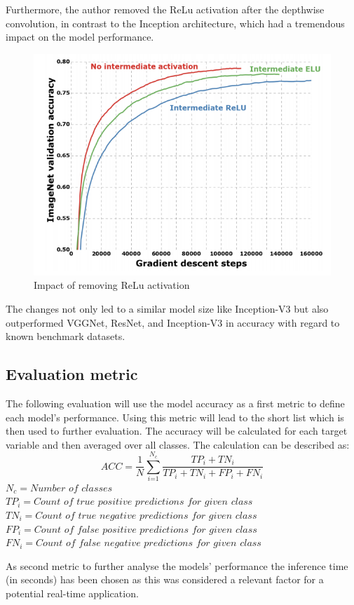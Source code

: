 Furthermore, the author removed the ReLu activation after the depthwise convolution, in contrast to the Inception architecture, which had a tremendous impact on the model performance.
\begin{figure}
  \centering
  \includegraphics[width=\linewidth]{figures/xception_activation.png}
  \caption{Impact of removing ReLu activation\cite{chollet2017xception}}
  \label{xception_activation}
\end{figure}

The changes not only led to a similar model size like Inception-V3 but also outperformed  VGGNet, ResNet, and Inception-V3 in accuracy with regard to known benchmark datasets\cite{chollet2017xception}.

\subsection{Evaluation metric}

The following evaluation will use the model accuracy as a first metric to define each model's performance. Using this metric will lead to the short list which is then used to further evaluation. The accuracy will be calculated for each target variable and then averaged over all classes. The calculation can be described as:
\begin{equation}
ACC=\frac{1}{N} \sum_\textit{i=1}^{N_\textit{c}} \displaystyle\frac{TP_{\textit{i}}+TN_{\textit{i}}}{TP_{\textit{i}}+TN_{\textit{i}}+FP_{\textit{i}}+FN_{\textit{i}}}
\end{equation}
\break
$N_\textit{c}=\textit{Number of classes}$\\
$TP_\textit{i} = \textit{Count of true positive predictions for given class}$\\
$TN_\textit{i} = \textit{Count of true negative predictions for given class}$\\
$FP_\textit{i} = \textit{Count of false positive predictions for given class}$\\
$FN_\textit{i} = \textit{Count of false negative predictions for given class}$

As second metric to further analyse the models' performance the inference time (in seconds) has been chosen as this was considered a relevant factor for a potential real-time application.





